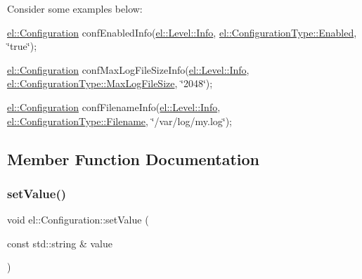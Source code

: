 Consider some examples below\+:
\begin{DoxyItemize}
\item \hyperlink{classel_1_1_configuration}{el\+::\+Configuration} conf\+Enabled\+Info(\hyperlink{namespaceel_ab0ac6091262344c52dd2d3ad099e8e36a4059b0251f66a18cb56f544728796875}{el\+::\+Level\+::\+Info}, \hyperlink{namespaceel_a281f5db6d6163678bc68a8b23b59e124a00d23a76e43b46dae9ec7aa9dcbebb32}{el\+::\+Configuration\+Type\+::\+Enabled}, \char`\"{}true\char`\"{});
\item \hyperlink{classel_1_1_configuration}{el\+::\+Configuration} conf\+Max\+Log\+File\+Size\+Info(\hyperlink{namespaceel_ab0ac6091262344c52dd2d3ad099e8e36a4059b0251f66a18cb56f544728796875}{el\+::\+Level\+::\+Info}, \hyperlink{namespaceel_a281f5db6d6163678bc68a8b23b59e124a4b35e615142d60db6383426f051e700b}{el\+::\+Configuration\+Type\+::\+Max\+Log\+File\+Size}, \char`\"{}2048\char`\"{});
\item \hyperlink{classel_1_1_configuration}{el\+::\+Configuration} conf\+Filename\+Info(\hyperlink{namespaceel_ab0ac6091262344c52dd2d3ad099e8e36a4059b0251f66a18cb56f544728796875}{el\+::\+Level\+::\+Info}, \hyperlink{namespaceel_a281f5db6d6163678bc68a8b23b59e124a1351017ac6423911223bc19a8cb7c653}{el\+::\+Configuration\+Type\+::\+Filename}, \char`\"{}/var/log/my.\+log\char`\"{}); 
\end{DoxyItemize}

\subsection{Member Function Documentation}
\mbox{\label{classel_1_1_configuration_a04755de11422d7570869433ea157b705}} 
\subsubsection{\texorpdfstring{set\+Value()}{setValue()}}
{\footnotesize\ttfamily void el\+::\+Configuration\+::set\+Value (\begin{DoxyParamCaption}\item[{const std\+::string \&}]{value }\end{DoxyParamCaption})\hspace{0.3cm}{\ttfamily [inline]}}



